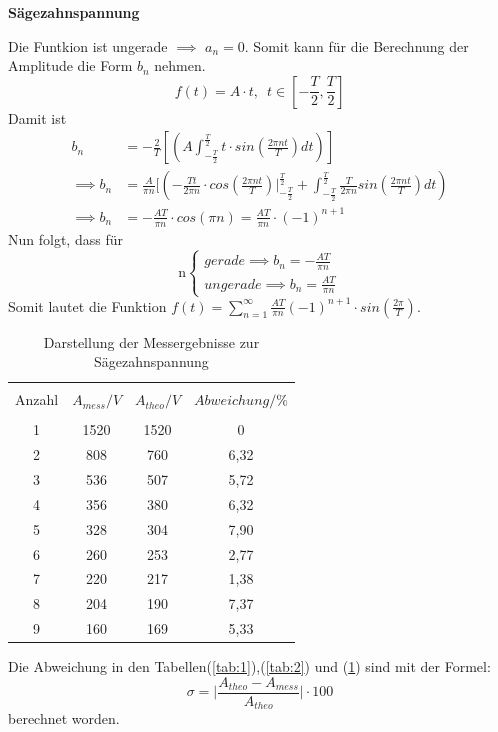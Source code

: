 \centerline{\textbf{Sägezahnspannung}}
Die Funtkion ist ungerade $\implies$ $a_n = 0$.
Somit kann für die Berechnung der Amplitude die Form $b_n$ nehmen.
\begin{equation*}
f(t) = A\cdot t , \,\,\, t\in [-\frac{T}{2},\frac{T}{2}]
\end{equation*}
Damit ist
\begin{align*}
  b_n &= -\frac{2}{T} [(A \int_{-\frac{T}{2}}^{\frac{T}{2}} t\cdot sin(\frac{2\pi nt}{T})dt)]\\
\implies b_n &=\frac{A}{\pi n} [(-\frac{Tt}{2\pi n} \cdot cos(\frac{2\pi nt}{T})\bigl|_{-\frac{T}{2}}^{\frac{T}{2}} + \int_{-\frac{T}{2}}^{\frac{T}{2}} \frac{T}{2\pi n} sin(\frac{2\pi nt}{T})dt) \\
\implies b_n &= -\frac{AT}{\pi n}\cdot cos(\pi n) = \frac{AT}{\pi n}\cdot (-1)^{n+1}
\end{align*}
Nun folgt, dass für
\begin{equation*}
  \text{n}
  \begin{cases}
    gerade \implies b_n = -\frac{AT}{\pi n}\,\, \\
    ungerade \implies b_n =\frac{AT}{\pi n}
  \end{cases}
\end{equation*}
Somit lautet die Funktion $f(t) = \sum^{\infty}_{n=1} \frac{AT}{\pi n}(-1)^{n+1} \cdot sin(\frac{2\pi}{T})$.
\begin{table}[H]
  \centering
  \begin{tabular}{c c c c}
    \toprule\\
    Anzahl & $A_{mess} / V$ & $A_{theo} / V$ & $Abweichung / \% $\\
    \midrule \\
    1 & 1520 & 1520 & 0\\
    2 & 808 & 760 & 6,32\\
    3 & 536 & 507 & 5,72\\
    4 & 356 & 380 & 6,32\\
    5 & 328 & 304 & 7,90\\
    6 & 260 & 253 & 2,77\\
    7 & 220 & 217 & 1,38\\
    8 & 204 & 190 & 7,37\\
    9 & 160 & 169 & 5,33\\
    \bottomrule
  \end{tabular}
  \caption{Darstellung der Messergebnisse zur Sägezahnspannung}
  \label{tab:3}
\end{table}
Die Abweichung in den Tabellen(\ref{tab:1}),(\ref{tab:2}) und (\ref{tab:3}) sind mit der Formel:
\begin{equation*}
  \sigma = \biggl| \frac{A_{theo}-A_{mess}}{A_{theo}} \biggl| \cdot 100
\end{equation*}
berechnet worden.

